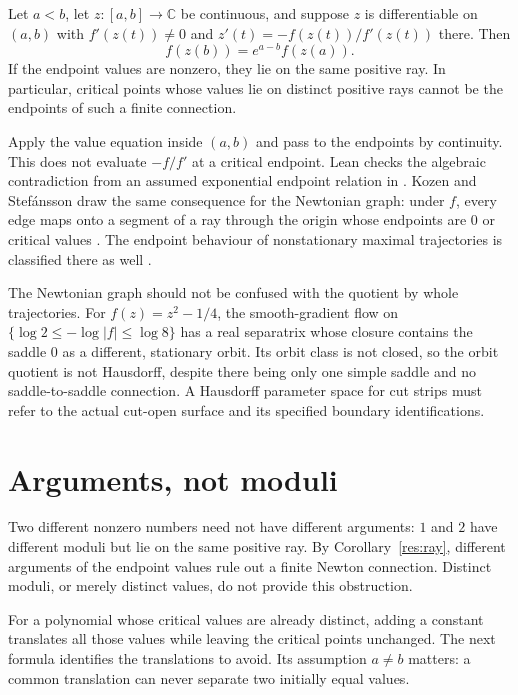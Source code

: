\documentclass[11pt]{article}
\begin{document}
\begin{corollary}\label{res:ray}
Let $a<b$, let $z:[a,b]\to\mathbb C$ be continuous, and suppose $z$ is
differentiable on $(a,b)$ with $f'(z(t))\ne0$ and
$z'(t)=-f(z(t))/f'(z(t))$ there.  Then
\[
 f(z(b))=e^{a-b}f(z(a)).
\]
If the endpoint values are nonzero, they lie on the same positive ray.
In particular, critical points whose values lie on distinct positive rays
cannot be the endpoints of such a finite connection.
\end{corollary}

\noindent Apply the value equation inside $(a,b)$ and pass to the
endpoints by continuity.  This does not evaluate $-f/f'$ at a critical
endpoint.  Lean checks the algebraic contradiction from an assumed
exponential endpoint relation in
.
Kozen and Stef\'ansson draw the same consequence for the Newtonian graph:
under $f$, every edge maps onto a segment of a ray through the origin whose
endpoints are $0$ or critical values \cite[\S2]{kozen-stefansson1997}.  The
endpoint behaviour of nonstationary maximal trajectories is classified
there as well \cite[Lemma~2.2]{kozen-stefansson1997}.

The Newtonian graph should not be confused with the quotient by whole
trajectories. For $f(z)=z^2-1/4$, the smooth-gradient flow on
$\{\log2\le-\log|f|\le\log8\}$ has a real separatrix whose closure
contains the saddle $0$ as a different, stationary orbit. Its orbit
class is not closed, so the orbit quotient is not Hausdorff, despite
there being only one simple saddle and no saddle-to-saddle connection.
A Hausdorff parameter space for cut strips must refer to the actual
cut-open surface and its specified boundary identifications.

\section{Arguments, not moduli}\label{sec:arguments}

Two different nonzero numbers need not have different arguments: $1$ and
$2$ have different moduli but lie on the same positive ray. By
Corollary~\ref{res:ray}, different arguments of the endpoint values rule
out a finite Newton connection. Distinct moduli, or merely distinct
values, do not provide this obstruction.

For a polynomial whose critical values are already distinct, adding a
constant translates all those values while leaving the critical points
unchanged. The next formula identifies the translations to avoid. Its
assumption $a\ne b$ matters: a common translation can never separate two
initially equal values.
\end{document}
